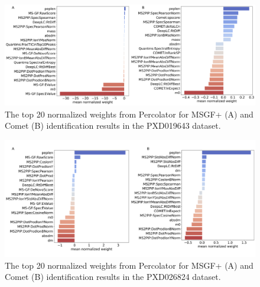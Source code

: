 \documentclass[12pt]{article}
\begin{document}
\begin{figure}[h!]
	\centering
	\includegraphics[width=1\textwidth]{figures//PXD019643_weights.png}
	\caption{The top 20 normalized weights from Percolator for MSGF+ (A) and Comet (B) identification results in the PXD019643 dataset.}
	\label{fig:PXD019643_features}
\end{figure}

\begin{figure}[h!]
	\centering
	\includegraphics[width=1\textwidth]{figures//phos_weights.png}
	\caption{The top 20 normalized weights from Percolator for MSGF+ (A) and Comet (B) identification results in the PXD026824 dataset.}
	\label{fig:phospho_features}
\end{figure}
\end{document}
